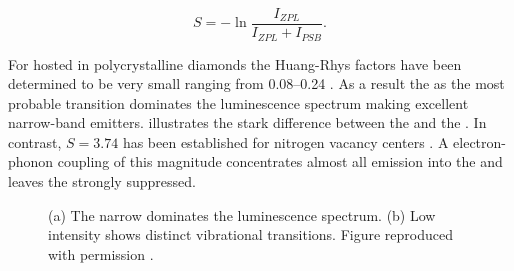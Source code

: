    \begin{equation}
     S = -\ln{\frac{I_{ZPL}}{I_{ZPL} + I_{PSB}}}.
   \end{equation}

   For \sivs hosted in polycrystalline diamonds the Huang-Rhys factors have been determined to be very small ranging from \SIrange{0.08}{0.24}{} \cite{Duligall2006,Yuan2002,Nothaft2012}. As a result the \zpl as the most probable transition dominates the luminescence spectrum making \sivs excellent narrow-band emitters.  illustrates the stark difference between the \zpl and the \psb. In contrast, $S=3.74$ has been established for nitrogen vacancy centers \cite{Davies1981}. A electron-phonon coupling of this magnitude concentrates almost all emission into the \psb and leaves the \zpl strongly suppressed.

   \begin{figure}[thbp]
 		\begin{subfigure}[t]{ 0.49\linewidth}
 			\centering
 			\caption{}
 		\end{subfigure}
 		\hfill
 		\begin{subfigure}[t]{ 0.49\linewidth}
 			\centering
 			\caption{}
 		\end{subfigure}
 		\caption[Fluorescence spectra of \sivs at room temperature]{(a) The narrow \zpl dominates the luminescence spectrum. (b) Low intensity \psb shows distinct vibrational transitions. Figure reproduced with permission \cite{Riedrich-moller2014}.}
 		\label{fig::spectral_features}
 	\end{figure}



